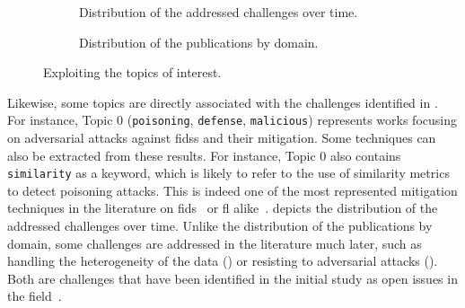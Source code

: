 \begin{figure}
  \centering
  \begin{subfigure}{0.48\textwidth}
    \centering
    
    \caption{
      Distribution of the addressed challenges over time.
      \label{fig:sota.challenges}
    }
  \end{subfigure}
  \hfill
  \begin{subfigure}{0.48\textwidth}
    \centering
    
    \caption{
      Distribution of the publications by domain.
      \label{fig:sota.domains}
    }
  \end{subfigure}
  \caption{
    Exploiting the topics of interest.
    \label{fig:sota.challenges-domains}
  }
\end{figure}

Likewise, some topics are directly associated with the challenges identified in .
For instance, Topic 0 (\texttt{poisoning}, \texttt{defense}, \texttt{malicious}) represents works focusing on adversarial attacks against \glspl{fids} and their mitigation. 
Some techniques can also be extracted from these results.
For instance, Topic 0 also contains \texttt{similarity} as a keyword, which is likely to refer to the use of similarity metrics to detect poisoning attacks.
This is indeed one of the most represented mitigation techniques in the literature on \gls{fids}~\cite{yang_Dependablefederatedlearning_2023} or \gls{fl} alike~\cite{fung_LimitationsFederatedLearning_2020,nguyen_FLAMETamingBackdoors_2022}.
 depicts the distribution of the addressed challenges over time.
Unlike the distribution of the publications by domain, some challenges are addressed in the literature much later, such as handling the heterogeneity of the data () or resisting to adversarial attacks ().
Both are challenges that have been identified in the initial study as open issues in the field~\cite{lavaur_EvolutionFederatedLearningbased_2022,lavaur_Federatedlearningenabler_2022}.